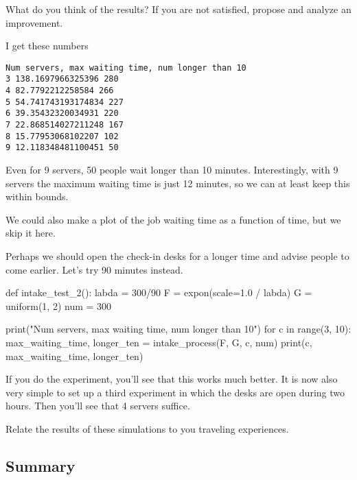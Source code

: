 \begin{exercise}
  What do you think of the results? If you are not satisfied, propose and analyze an improvement.

  \begin{solution}
    I get these numbers

\begin{verbatim}
Num servers, max waiting time, num longer than 10
3 138.1697966325396 280
4 82.7792212258584 266
5 54.741743193174834 227
6 39.35432320034931 220
7 22.868514027211248 167
8 15.77953068102207 102
9 12.118348481100451 50
\end{verbatim}
    
    Even for 9 servers, 50 people wait longer than 10 minutes. Interestingly, with 9 servers the maximum waiting time is just 12 minutes, so we can at least keep this within bounds.

We could also make a plot of the job waiting time as a function of time, but we skip it here. 


Perhaps we should open the check-in desks for a longer time and advise people to come earlier. Let's try 90 minutes instead.

\begin{pyblock}

def intake_test_2():
    labda = 300/90
    F = expon(scale=1.0 / labda)
    G = uniform(1, 2)
    num = 300

    print("Num servers, max waiting time, num longer than 10")
    for c in range(3, 10):
        max_waiting_time, longer_ten = intake_process(F, G, c, num)
        print(c, max_waiting_time, longer_ten)

  
\end{pyblock}

If you do the experiment, you'll see that this works much better. It is now also very simple to set up a third experiment in which the desks are open during two hours. Then you'll see that 4 servers  suffice. 

  \end{solution}

\end{exercise}

\begin{exercise}
  Relate the results of these simulations to you traveling experiences. 
\end{exercise}


\subsection{Summary}
\label{sec:summary}


